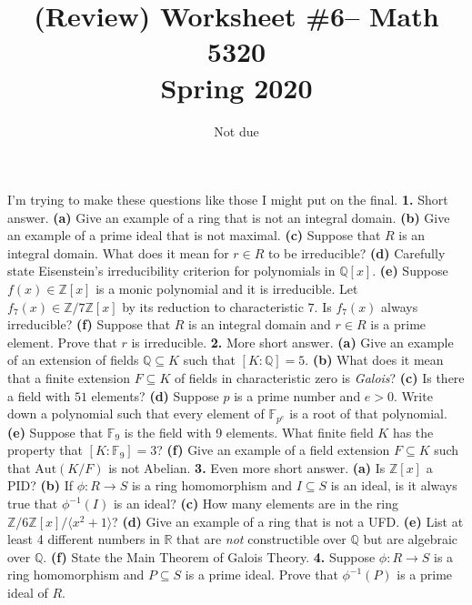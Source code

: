 \documentclass[10pt]{amsart}
\theoremstyle{theorem}
\renewcommand{\to}[1][]{\xrightarrow{\ #1\ }}
\newcommand{\bR}{{\mathbb{R}}}
\newcommand{\bF}{\mathbb{F}}
\newcommand{\bQ}{\mathbb{Q}}
\newcommand{\bZ}{\mathbb{Z}}
\newcommand{\Aut}{\mathrm{Aut}}
\begin{document}
\title{(Review) Worksheet \#6-- Math 5320\\Spring 2020}
\author{Not due}
\maketitle

I'm trying to make these questions like those I might put on the final.
\noindent
{\bf 1.}  Short answer.
\vskip 3pt
{\bf (a)}  Give an example of a ring that is not an integral domain.
\vskip 75pt
{\bf (b)}  Give an example of a prime ideal that is not maximal.
\vskip 75pt
{\bf (c)}  Suppose that $R$ is an integral domain.  What does it mean for $r \in R$ to be irreducible? 
\vskip 75pt
{\bf (d)}  Carefully state Eisenstein's irreducibility criterion for polynomials in $\bQ[x]$.
\vskip 75pt
{\bf (e)}  Suppose $f(x) \in \bZ[x]$ is a monic polynomial and it is irreducible.  Let $f_7(x) \in \bZ/7\bZ[x]$ by its reduction to characteristic $7$.  Is $f_7(x)$ always irreducible?
\vskip 75pt
{\bf (f)}  Suppose that $R$ is an integral domain and $r \in R$ is a prime element.  Prove that $r$ is irreducible.
\newpage
\noindent
{\bf 2.}  More short answer.
\vskip 3pt
{\bf (a)}  Give an example of an extension of fields $\bQ \subseteq K$ such that $[K : \bQ] = 5$.
\vskip 75pt
{\bf (b)}  What does it mean that a finite extension $F \subseteq K$ of fields in characteristic zero is \emph{Galois}?
\vskip 75pt
{\bf (c)}  Is there a field with $51$ elements?
\vskip 75pt
{\bf (d)}  Suppose $p$ is a prime number and $e > 0$.  Write down a polynomial such that every element of $\bF_{p^e}$ is a root of that polynomial.
\vskip 75pt
{\bf (e)}  Suppose that $\bF_9$ is the field with 9 elements.  What finite field $K$ has the property that $[K : \bF_9] = 3$?
\vskip 75pt
{\bf (f)}  Give an example of a field extension $F \subseteq K$ such that $\Aut(K/F)$ is not Abelian.
\newpage
{\bf 3.}  Even more short answer.
\noindent
\vskip 3pt
{\bf (a)}  Is $\bZ[x]$ a PID?
\vskip 75pt
{\bf (b)}  If $\phi : R \to S$ is a ring homomorphism and $I \subseteq S$ is an ideal, is it always true that $\phi^{-1}(I)$ is an ideal?
\vskip 75pt
{\bf (c)}  How many elements are in the ring $\bZ/6\bZ[x]/\langle x^2 + 1 \rangle$?
\vskip 75pt
{\bf (d)}  Give an example of a ring that is not a UFD.
\vskip 75pt
{\bf (e)}  List at least 4 different numbers in $\bR$ that are \emph{not} constructible over $\bQ$ but are algebraic over $\bQ$.
\vskip 75pt
{\bf (f)}  State the Main Theorem of Galois Theory.
\newpage
\noindent
{\bf 4.}  Suppose $\phi : R \to S$ is a ring homomorphism and $P \subseteq S$ is a prime ideal.  Prove that $\phi^{-1}(P)$ is a prime ideal of $R$.
\end{document}
